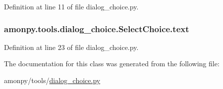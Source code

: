 Definition at line 11 of file dialog\-\_\-choice.\-py.

\hypertarget{classamonpy_1_1tools_1_1dialog__choice_1_1_select_choice_a7823bcbaf7fa0bac5c175828edb1fc67}{
\subsubsection[{text}]{\setlength{\rightskip}{0pt plus 5cm}amonpy.\-tools.\-dialog\-\_\-choice.\-Select\-Choice.\-text}}\label{classamonpy_1_1tools_1_1dialog__choice_1_1_select_choice_a7823bcbaf7fa0bac5c175828edb1fc67}


Definition at line 23 of file dialog\-\_\-choice.\-py.



The documentation for this class was generated from the following file\-:\begin{DoxyCompactItemize}
\item 
amonpy/tools/\hyperlink{dialog__choice_8py}{dialog\-\_\-choice.\-py}\end{DoxyCompactItemize}
